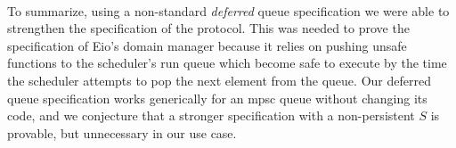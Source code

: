 \paragraph*{}
To summarize, using a non-standard \emph{deferred} queue specification we were able to strengthen the specification of the \esuspend{} protocol.
This was needed to prove the specification of Eio's domain manager because it relies on pushing unsafe functions to the scheduler's run queue which become safe to execute by the time the scheduler attempts to pop the next element from the queue.
Our deferred queue specification works generically for an mpsc queue without changing its code, and we conjecture that a stronger specification with a non-persistent \(S\) is provable, but unnecessary in our use case.

